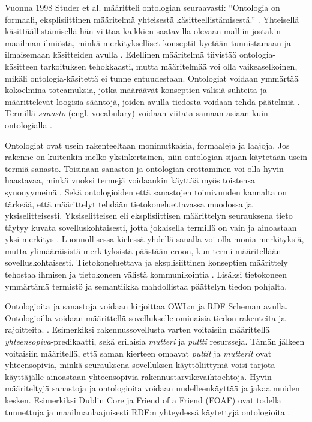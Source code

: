 \documentclass[finnish, 12pt, a4paper, elec, utf8, pdfa, online]{aaltothesis}
\begin{document}
{%
Vuonna 1998 Studer et al. määritteli ontologian seuraavasti: ``Ontologia on formaali, eksplisiittinen määritelmä yhteisestä käsitteellistämisestä.'' \cite{ontology_def}. Yhteisellä käsittäällistämisellä hän viittaa kaikkien saatavilla olevaan malliin jostakin maailman ilmiöstä, minkä merkitykselliset konseptit kyetään tunnistamaan ja ilmaisemaan käsitteiden avulla \cite{ontology_def}. Edellinen määritelmä tiivistää ontologia-käsitteen tarkoituksen tehokkaasti, mutta määritelmää voi olla vaikeaselkoinen, mikäli ontologia-käsitettä ei tunne entuudestaan. Ontologiat voidaan ymmärtää kokoelmina toteamuksia, jotka määräävät konseptien välisiä suhteita ja määrittelevät loogisia sääntöjä, joiden avulla tiedosta voidaan tehdä päätelmiä \cite{Berners_visio}. Termillä \textit{sanasto} (engl. vocabulary) voidaan viitata samaan asiaan kuin ontologialla \cite{vocabulary}.

Ontologiat ovat usein rakenteeltaan monimutkaisia, formaaleja ja laajoja. Jos rakenne on kuitenkin melko yksinkertainen, niin ontologian sijaan käytetään usein termiä sanasto. Toisinaan sanaston ja ontologian erottaminen voi olla hyvin haastavaa, minkä vuoksi termejä voidaankin käyttää myös toistensa synonyymeinä \cite{vocabulary}. Sekä ontologioiden että sanastojen toimivuuden kannalta on tärkeää, että määrittelyt tehdään tietokoneluettavassa muodossa ja yksiselitteisesti. Yksiselitteisen eli eksplisiittisen määrittelyn seurauksena tieto täytyy kuvata sovelluskohtaisesti, jotta jokaisella termillä on vain ja ainoastaan yksi merkitys \cite{RDF_specification}. Luonnollisessa kielessä yhdellä sanalla voi olla monia merkityksiä, mutta ylimääräisistä merkityksistä päästään eroon, kun termi määritellään sovelluskohtaisesti. Tietokoneluettava ja eksplisiittinen konseptien määrittely tehostaa ihmisen ja tietokoneen välistä kommunikointia \cite{ontology_learning}. Lisäksi tietokoneen ymmärtämä termistö ja semantiikka mahdollistaa päättelyn tiedon pohjalta.

Ontologioita ja sanastoja voidaan kirjoittaa OWL:n ja RDF Scheman avulla. Ontologioilla voidaan määrittellä sovellukselle ominaisia tiedon rakenteita ja rajoitteita. \cite{vocabulary}. Esimerkiksi rakennussovellusta varten voitaisiin määrittellä \textit{yhteensopiva}-predikaatti, sekä erilaisia \textit{mutteri} ja \textit{pultti} resursseja. Tämän jälkeen voitaisiin määritellä, että saman kierteen omaavat \textit{pultit} ja \textit{mutterit} ovat yhteensopivia, minkä seurauksena sovelluksen käyttöliittymä voisi tarjota käyttäjälle ainoastaan yhteensopivia rakennustarvikevaihtoehtoja. Hyvin määriteltyjä sanastoja ja ontologioita voidaan uudelleenkäyttää ja jakaa muiden kesken. Esimerkiksi Dublin Core ja Friend of a Friend (FOAF) ovat todella tunnettuja ja maailmanlaajuisesti RDF:n yhteydessä käytettyjä ontologioita \cite{data_namespace}.

}
\end{document}
